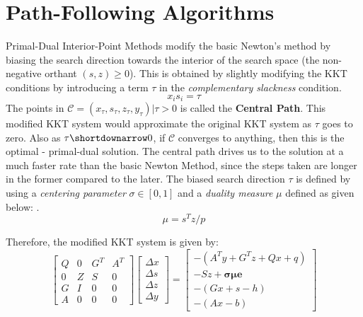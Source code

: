 \section{Path-Following Algorithms}\label{PFA}
\par Primal-Dual Interior-Point Methods modify the basic Newton's method by biasing the search direction towards the interior of the search space (the non-negative orthant $(s,z)\geq0$). This is obtained by slightly modifying the KKT conditions by introducing a term $\tau$ in the \textit{complementary slackness} condition.
\begin{equation}
    x_is_i=\tau
\end{equation}
\hspace{30pt} The points in $\mathcal{C}={(x_\tau,s_\tau,z_\tau,y_\tau)|\tau>0}$ is called the \textbf{Central Path}. This modified KKT system would approximate the original KKT system as $\tau$ goes to zero. Also as $\tau \shortdownarrow 0$, if $\mathcal{C}$ converges to anything, then this is the optimal - primal-dual solution. The central path drives us to the solution at a much faster rate than the basic Newton Method, since the steps taken are longer in the former compared to the later. The biased search direction $\tau$ is defined by using a \textit{centering parameter} $\sigma\in[0,1]$ and a \textit{duality measure} $\mu$ defined as given below: \cite{wright1997primal}. 
\begin{equation}
    \mu= s^{T} z / p
\end{equation}\par
Therefore, the modified KKT system is given by:
\begin{equation} \label{KKT_mod}
\left[\begin{array}{cccc}Q & 0 & G^{T} & A^{T} \\ 0 & Z & S & 0 \\ G & I & 0 & 0 \\ A & 0 & 0 & 0\end{array}\right]\left[\begin{array}{c}\Delta x \\ \Delta s \\ \Delta z \\ \Delta y\end{array}\right]=\left[\begin{array}{c}-\left(A^{T} y+G^{T} z+Q x+q\right) \\ -S z + \boldsymbol{\sigma \mu e}\\ -(G x+s-h) \\ -(A x-b)\end{array}\right]
\end{equation}
